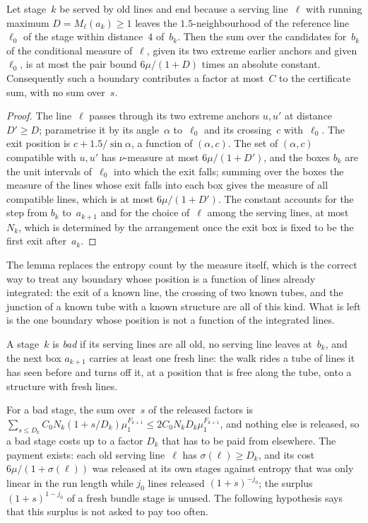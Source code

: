\documentclass[11pt,letterpaper]{article}
\begin{document}
\begin{lemma}
\label{lem:oldexit}
Let stage~$k$ be served by old lines and end because a serving line~$\ell$ with running maximum $D=M_\ell(a_k)\ge1$ leaves the $1.5$-neighbourhood of the reference line~$\ell_0$ of the stage within distance~$4$ of~$b_k$. Then the sum over the candidates for~$b_k$ of the conditional measure of~$\ell$, given its two extreme earlier anchors and given~$\ell_0$, is at most the pair bound $6\mu/(1+D)$ times an absolute constant. Consequently such a boundary contributes a factor at most~$C$ to the certificate sum, with no sum over~$s$.
\end{lemma}

\begin{proof}
The line~$\ell$ passes through its two extreme anchors $u,u'$ at distance $D'\ge D$; parametrise it by its angle~$\alpha$ to~$\ell_0$ and its crossing~$c$ with~$\ell_0$. The exit position is $c+1.5/\sin\alpha$, a function of $(\alpha,c)$. The set of $(\alpha,c)$ compatible with $u,u'$ has $\nu$-measure at most $6\mu/(1+D')$, and the boxes $b_k$ are the unit intervals of~$\ell_0$ into which the exit falls; summing over the boxes the measure of the lines whose exit falls into each box gives the measure of all compatible lines, which is at most $6\mu/(1+D')$. The constant accounts for the step from $b_k$ to~$a_{k+1}$ and for the choice of~$\ell$ among the serving lines, at most $N_k$, which is determined by the arrangement once the exit box is fixed to be the first exit after~$a_k$.
\end{proof}

The lemma replaces the entropy count by the measure itself, which is the correct way to treat any boundary whose position is a function of lines already integrated: the exit of a known line, the crossing of two known tubes, and the junction of a known tube with a known structure are all of this kind. What is left is the one boundary whose position is not a function of the integrated lines.

\begin{definition}
\label{def:bad}
A stage~$k$ is \emph{bad} if its serving lines are all old, no serving line leaves at~$b_k$, and the next box $a_{k+1}$ carries at least one fresh line: the walk rides a tube of lines it has seen before and turns off it, at a position that is free along the tube, onto a structure with fresh lines.
\end{definition}

For a bad stage, the sum over~$s$ of the released factors is $\sum_{s\le D_k}C_0N_k(1+s/D_k)\mu_1^{F_{k+1}}\le2C_0N_kD_k\mu_1^{F_{k+1}}$, and nothing else is released, so a bad stage costs up to a factor $D_k$ that has to be paid from elsewhere. The payment exists: each old serving line~$\ell$ has $\sigma(\ell)\ge D_k$, and its cost $6\mu/(1+\sigma(\ell))$ was released at its own stages against entropy that was only linear in the run length while $j_0$ lines released $(1+s)^{-j_0}$; the surplus $(1+s)^{1-j_0}$ of a fresh bundle stage is unused. The following hypothesis says that this surplus is not asked to pay too often.
\end{document}
